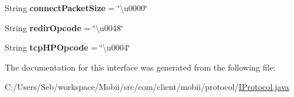 \begin{DoxyCompactItemize}
\item 
\hypertarget{interfacecom_1_1client_1_1mobii_1_1protocol_1_1_i_protocol_a2a6e544e3f7e4ccd38c80f101b79e037}{String {\bfseries connect\-Packet\-Size} = \char`\"{}\textbackslash{}u0000\char`\"{}}\label{interfacecom_1_1client_1_1mobii_1_1protocol_1_1_i_protocol_a2a6e544e3f7e4ccd38c80f101b79e037}

\item 
\hypertarget{interfacecom_1_1client_1_1mobii_1_1protocol_1_1_i_protocol_a298145d143e8fcee2f9d838e15d209f8}{String {\bfseries redir\-Opcode} = \char`\"{}\textbackslash{}u0048\char`\"{}}\label{interfacecom_1_1client_1_1mobii_1_1protocol_1_1_i_protocol_a298145d143e8fcee2f9d838e15d209f8}

\item 
\hypertarget{interfacecom_1_1client_1_1mobii_1_1protocol_1_1_i_protocol_ac697cca889c2f0227094b1566c8afa85}{String {\bfseries tcp\-H\-P\-Opcode} = \char`\"{}\textbackslash{}u0004\char`\"{}}\label{interfacecom_1_1client_1_1mobii_1_1protocol_1_1_i_protocol_ac697cca889c2f0227094b1566c8afa85}

\end{DoxyCompactItemize}


The documentation for this interface was generated from the following file\-:\begin{DoxyCompactItemize}
\item 
C\-:/\-Users/\-Seb/workspace/\-Mobii/src/com/client/mobii/protocol/\hyperlink{_i_protocol_8java}{I\-Protocol.\-java}\end{DoxyCompactItemize}
